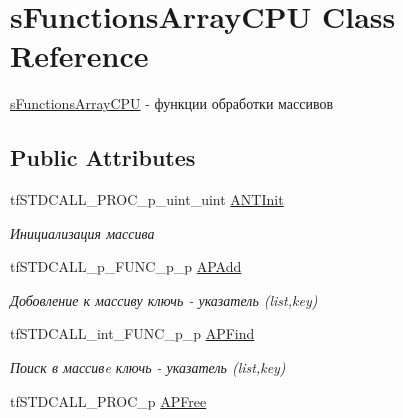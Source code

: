 \hypertarget{structs_functions_array_c_p_u}{\section{s\-Functions\-Array\-C\-P\-U Class Reference}
\label{structs_functions_array_c_p_u}
}


\hyperlink{structs_functions_array_c_p_u}{s\-Functions\-Array\-C\-P\-U} -\/ функции обработки массивов  


\subsection*{Public Attributes}
\begin{DoxyCompactItemize}
\item 
\hypertarget{structs_functions_array_c_p_u_aa6c1cd722c5a20c267958e582ed59d09}{tf\-S\-T\-D\-C\-A\-L\-L\-\_\-\-P\-R\-O\-C\-\_\-p\-\_\-uint\-\_\-uint \hyperlink{structs_functions_array_c_p_u_aa6c1cd722c5a20c267958e582ed59d09}{A\-N\-T\-Init}}\label{structs_functions_array_c_p_u_aa6c1cd722c5a20c267958e582ed59d09}

\begin{DoxyCompactList}\small\item\em Инициализация массива \end{DoxyCompactList}\item 
\hypertarget{structs_functions_array_c_p_u_a42ce569e7398e893f88f4808ae0c94b0}{tf\-S\-T\-D\-C\-A\-L\-L\-\_\-p\-\_\-\-F\-U\-N\-C\-\_\-p\-\_\-p \hyperlink{structs_functions_array_c_p_u_a42ce569e7398e893f88f4808ae0c94b0}{A\-P\-Add}}\label{structs_functions_array_c_p_u_a42ce569e7398e893f88f4808ae0c94b0}

\begin{DoxyCompactList}\small\item\em Добовление к массиву ключь -\/ указатель (list,key) \end{DoxyCompactList}\item 
\hypertarget{structs_functions_array_c_p_u_abcd20cfe87e4588fc2ba0a34eeaf82cb}{tf\-S\-T\-D\-C\-A\-L\-L\-\_\-int\-\_\-\-F\-U\-N\-C\-\_\-p\-\_\-p \hyperlink{structs_functions_array_c_p_u_abcd20cfe87e4588fc2ba0a34eeaf82cb}{A\-P\-Find}}\label{structs_functions_array_c_p_u_abcd20cfe87e4588fc2ba0a34eeaf82cb}

\begin{DoxyCompactList}\small\item\em Поиск в массивe ключь -\/ указатель (list,key) \end{DoxyCompactList}\item 
\hypertarget{structs_functions_array_c_p_u_af312f1c835b09e44fe8a42bc2becfd3c}{tf\-S\-T\-D\-C\-A\-L\-L\-\_\-\-P\-R\-O\-C\-\_\-p \hyperlink{structs_functions_array_c_p_u_af312f1c835b09e44fe8a42bc2becfd3c}{A\-P\-Free}}\label{structs_functions_array_c_p_u_af312f1c835b09e44fe8a42bc2becfd3c}


\end{DoxyCompactItemize}
